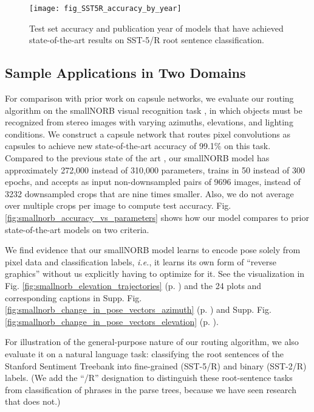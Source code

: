 \documentclass[11pt,a4paper]{article}
\begin{document}
\begin{figure}[t]
	\vskip 0.1in
	\begin{center}
		\centerline{\texttt{[image: fig\_SST5R\_accuracy\_by\_year]}}
		\caption{Test set accuracy and publication year of models that have achieved state-of-the-art results on SST-5/R root sentence classification.}
		\label{fig:SST5R_accuracy_by_year}
	\end{center}
	\vskip -0.2in
\end{figure} 

\subsection*{Sample Applications in Two Domains}


For comparison with prior work on capsule networks, we evaluate our routing algorithm on the smallNORB visual recognition task \cite{LeCun:2004:LMG:1896300.1896315}, in which objects must be recognized from stereo images with varying azimuths, elevations, and lighting conditions. We construct a capsule network that routes pixel convolutions as capsules to achieve new state-of-the-art accuracy of 99.1\% on this task. Compared to the previous state of the art \cite{46653}, our smallNORB model has approximately 272,000 instead of 310,000 parameters, trains in 50 instead of 300 epochs, and accepts as input non-downsampled pairs of 9696 images, instead of 3232 downsampled crops that are nine times smaller. Also, we do not average over multiple crops per image to compute test accuracy. Fig. \ref{fig:smallnorb_accuracy_vs_parameters} shows how our model compares to prior state-of-the-art models on two criteria.

We find evidence that our smallNORB model learns to encode pose solely from pixel data and classification labels, {\em i.e.}, it learns its own form of ``reverse graphics'' without us explicitly having to optimize for it. See the visualization in Fig. \ref{fig:smallnorb_elevation_trajectories} (p. \pageref{fig:smallnorb_elevation_trajectories}) and the 24 plots and corresponding captions in Supp. Fig. \ref{fig:smallnorb_change_in_pose_vectors_azimuth} (p. \pageref{fig:smallnorb_change_in_pose_vectors_azimuth}) and Supp. Fig. \ref{fig:smallnorb_change_in_pose_vectors_elevation} (p. \pageref{fig:smallnorb_change_in_pose_vectors_elevation}).

For illustration of the general-purpose nature of our routing algorithm, we also evaluate it on a natural language task: classifying the root sentences of the Stanford Sentiment Treebank \cite{brusilovsky:socher2013recursive} into fine-grained (SST-5/R) and binary (SST-2/R) labels. (We add the ``/R'' designation to distinguish these root-sentence tasks from classification of phrases in the parse trees, because we have seen research that does not.)
\end{document}
